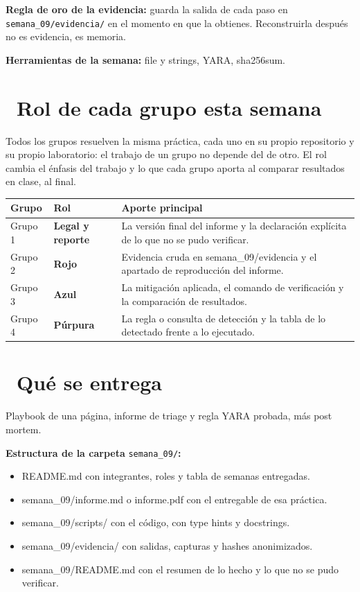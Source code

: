 \documentclass[11pt,a4paper]{article}
\newcommand{\iconotexto}[2]{\textcolor{cyanNeon}{\faIcon{#1}}~#2}
\begin{document}
\begin{cajaConcepto}\textbf{Regla de oro de la evidencia:} guarda la salida de cada paso en \texttt{semana\_09/evidencia/} en el momento en que la obtienes. Reconstruirla después no es evidencia, es memoria.
\end{cajaConcepto}

\textbf{Herramientas de la semana:} file y strings, YARA, sha256sum.

\section{\iconotexto{users}{Rol de cada grupo esta semana}}

Todos los grupos resuelven la misma práctica, cada uno en su propio repositorio y su propio laboratorio: el trabajo de un grupo no depende del de otro. El rol cambia el énfasis del trabajo y lo que cada grupo aporta al comparar resultados en clase, al final.

\begin{tabularx}{\linewidth}{@{}l l X@{}}
\toprule
Grupo & Rol & Aporte principal\\
\midrule
Grupo 1 & \textbf{Legal y reporte} & La versión final del informe y la declaración explícita de lo que no se pudo verificar. \\
Grupo 2 & \textbf{Rojo} & Evidencia cruda en semana\_09/evidencia y el apartado de reproducción del informe. \\
Grupo 3 & \textbf{Azul} & La mitigación aplicada, el comando de verificación y la comparación de resultados. \\
Grupo 4 & \textbf{Púrpura} & La regla o consulta de detección y la tabla de lo detectado frente a lo ejecutado. \\
\bottomrule
\end{tabularx}

\section{\iconotexto{box-open}{Qué se entrega}}

Playbook de una página, informe de triage y regla YARA probada, más post mortem.

\textbf{Estructura de la carpeta} \texttt{semana\_09/}\textbf{:}

\begin{itemize}[leftmargin=1.4em,itemsep=2pt,topsep=3pt]
  \item README.md con integrantes, roles y tabla de semanas entregadas.
  \item semana\_09/informe.md o informe.pdf con el entregable de esa práctica.
  \item semana\_09/scripts/ con el código, con type hints y docstrings.
  \item semana\_09/evidencia/ con salidas, capturas y hashes anonimizados.
  \item semana\_09/README.md con el resumen de lo hecho y lo que no se pudo verificar.
\end{itemize}
\end{document}
